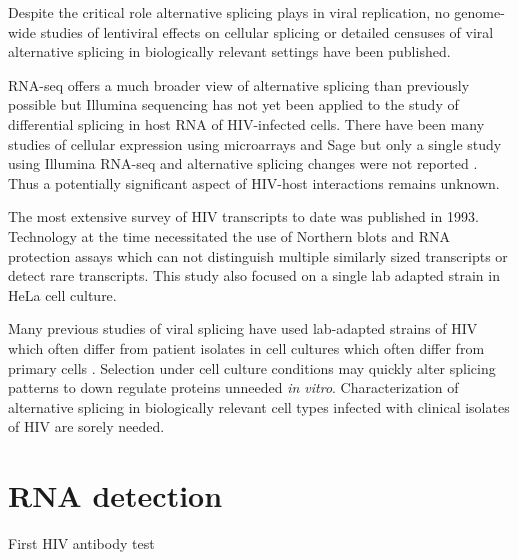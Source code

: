 \documentclass[../sherrill-Mix_thesis.tex]{subfiles}
\begin{document}
	Despite the critical role alternative splicing plays in viral replication, no genome-wide studies of lentiviral effects on cellular splicing or  detailed censuses of viral alternative splicing in biologically relevant settings have been published.

	RNA-seq offers a much broader view of alternative splicing than previously possible \citep{Trapnell2010,Rogers2012} but Illumina sequencing has not yet been applied to the study of differential splicing in host RNA of HIV-infected cells. There have been many studies of cellular expression using microarrays \citep{Vahey2002,Wout2003,Mitchell2003,Rotger2010,Miller2011} and Sage \citep{Ryo1999,Lefebvre2011} but only a single study using Illumina RNA-seq and alternative splicing changes were not reported \citep{Chang2011}. Thus a potentially significant aspect of HIV-host interactions remains unknown.

	The most extensive survey of HIV transcripts to date was published in 1993\citep{Purcell1993}. Technology at the time necessitated the use of Northern blots and RNA protection assays \citep{Purcell1993} which can not distinguish multiple similarly sized transcripts or detect rare transcripts. This study also focused on a single lab adapted \hivNL{} strain in HeLa cell culture.

	Many previous studies of viral splicing have used lab-adapted strains of HIV which often differ from patient isolates \citep{Fujita1992} in cell cultures which often differ from primary cells \citep{McAllister1971}. Selection under cell culture conditions may quickly alter splicing patterns to down regulate proteins unneeded \emph{in vitro}.  Characterization of alternative splicing in biologically relevant cell types infected with clinical isolates of HIV are sorely needed.


\section{RNA detection}
	First HIV antibody test \citep{Safai1984,Sarngadharan1984}
\end{document}
